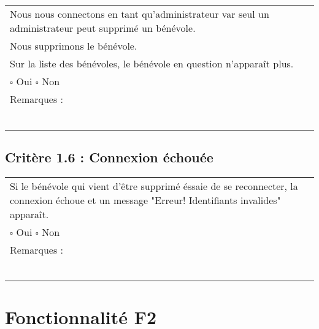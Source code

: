 		\begin{center}
    	 		\begin{tabular}[h]{|p{}|}
			\hline
				Nous nous connectons en tant qu'administrateur var seul un administrateur peut supprimé un bénévole. \\
				Nous supprimons le bénévole. \\
				Sur la liste des bénévoles, le bénévole en question n'apparaît plus. \\
				
				$\square$ Oui  \hfill \hfill $\square$ Non \\\hline Remarques : \\ ~\\
			 \\\hline
     		\end{tabular}
  		\end{center}	
  		
  	\subsection*{Critère 1.6 : Connexion échouée}
	
		\begin{center}
    	 		\begin{tabular}[h]{|p{}|}
			\hline
				Si le bénévole qui vient d'être supprimé éssaie de se reconnecter, la connexion échoue et un message "Erreur! Identifiants invalides" apparaît. \\
				
				$\square$ Oui  \hfill \hfill $\square$ Non \\\hline Remarques : \\ ~\\
			 \\\hline
     		\end{tabular}
  		\end{center}	
  		
  		
\section{Fonctionnalité F2}
  		
